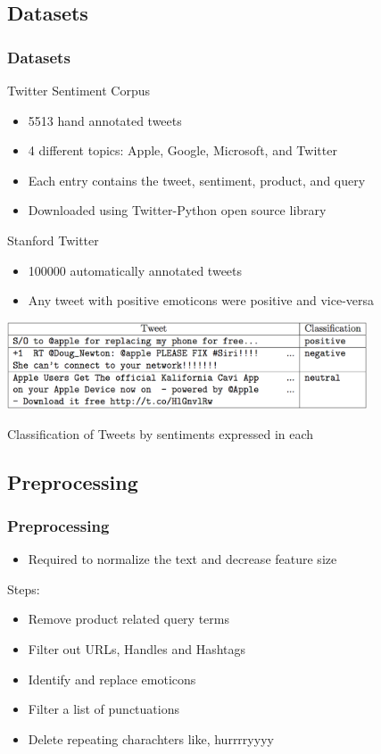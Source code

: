 \documentclass{beamer}
\begin{document}
\subsection{Datasets}

\begin{frame}
\frametitle{Datasets}

Twitter Sentiment Corpus
	\begin{itemize}
		\item 5513 hand annotated tweets
		\item 4 different topics: Apple, Google, Microsoft, and Twitter
		\item Each entry contains the tweet, sentiment, product, and query
		\item Downloaded using Twitter-Python open source library
	\end{itemize}

Stanford Twitter
	\begin{itemize}
		\item 100000 automatically annotated tweets
		\item Any tweet with positive emoticons were positive and vice-versa
	\end{itemize}

\begin{table}[h]
\centering
\includegraphics[width=0.8\textwidth]{img/table_tweets.png}
\caption{Classification of Tweets by sentiments expressed in each}
\label{table:twt}
\end{table}

\end{frame}

\subsection{Preprocessing}

\begin{frame}
\frametitle{Preprocessing}
\begin{itemize}
\item Required to normalize the text and decrease feature size
\end{itemize}
Steps:
\begin{itemize}
\item Remove product related query terms
\item Filter out URLs, Handles and Hashtags
\item Identify and replace emoticons
\item Filter a list of punctuations
\item Delete repeating charachters like, hurrrryyyy
\end{itemize}

\end{frame}
\end{document}
